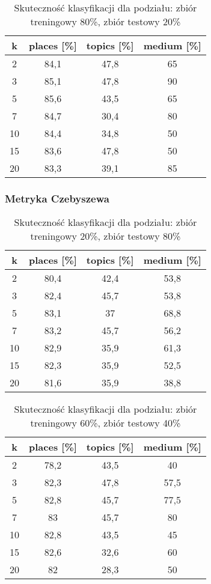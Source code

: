 \documentclass{classrep}
\begin{document}
\begin{table}[H]
	\centering
	\begin{tabular}{c c c c} 
		\hline
		\textbf{k} & \textbf{places [\%]} & \textbf{topics [\%]} &  \textbf{medium [\%]} \\ [0.5ex] 
		\hline
		\hline 
2 & 84,1 & 47,8 & 65 \\ 
3 & 85,1 & 47,8 & 90 \\ 
5 & 85,6 & 43,5 & 65 \\ 
7 & 84,7 & 30,4 & 80 \\ 
10 & 84,4 & 34,8 & 50 \\ 
15 & 83,6 & 47,8 & 50 \\ 
20 & 83,3 & 39,1 & 85 \\ 
		\hline
	\end{tabular}
	\caption{Skuteczność klasyfikacji dla podziału: zbiór treningowy 80\%, zbiór testowy 20\%}
\end{table}

\subsubsection{Metryka Czebyszewa}
\begin{table}[H]
	\centering
	\begin{tabular}{c c c c} 
		\hline
		\textbf{k} & \textbf{places [\%]} & \textbf{topics [\%]} &  \textbf{medium [\%]} \\ [0.5ex] 
		\hline
		\hline 
2 & 80,4 & 42,4 & 53,8 \\ 
3 & 82,4 & 45,7 & 53,8 \\ 
5 & 83,1 & 37 & 68,8 \\ 
7 & 83,2 & 45,7 & 56,2 \\ 
10 & 82,9 & 35,9 & 61,3 \\ 
15 & 82,3 & 35,9 & 52,5 \\ 
20 & 81,6 & 35,9 & 38,8 \\ 
		\hline
	\end{tabular}
	\caption{Skuteczność klasyfikacji dla podziału: zbiór treningowy 20\%, zbiór testowy 80\%}
\end{table}

\begin{table}[H]
	\centering
	\begin{tabular}{c c c c} 
		\hline
		\textbf{k} & \textbf{places [\%]} & \textbf{topics [\%]} &  \textbf{medium [\%]} \\ [0.5ex] 
		\hline
		\hline 
2 & 78,2 & 43,5 & 40 \\ 
3 & 82,3 & 47,8 & 57,5 \\ 
5 & 82,8 & 45,7 & 77,5 \\ 
7 & 83 & 45,7 & 80 \\ 
10 & 82,8 & 43,5 & 45 \\ 
15 & 82,6 & 32,6 & 60 \\ 
20 & 82 & 28,3 & 50 \\ 
		\hline
	\end{tabular}
	\caption{Skuteczność klasyfikacji dla podziału: zbiór treningowy 60\%, zbiór testowy 40\%}
\end{table}
\end{document}
